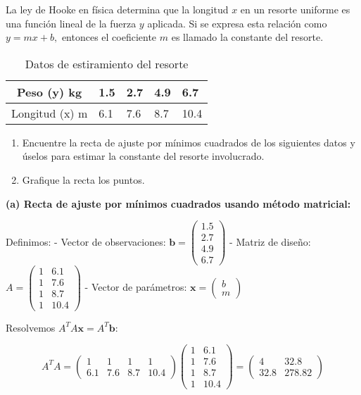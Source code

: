\begin{prob}
La ley de Hooke en física determina que la longitud $x$ en un resorte uniforme es una función lineal de la fuerza $y$ aplicada. Si se expresa esta relación como $y=mx+b,$ entonces el coeficiente $m$ es llamado la constante del resorte. 

\begin{table}[H]
\centering
\begin{tabular}{|c|l|l|l|l|}
\hline
Peso (y) kg  & 1.5   & 2.7   & 4.9  & 6.7    \\ \hline
Longitud (x) m & 6.1 & 7.6 & 8.7 & 10.4 \\ \hline
\end{tabular}
\caption{Datos de estiramiento del resorte}
\end{table}  

\begin{enumerate}[$(a)$]
\item Encuentre la recta de ajuste por mínimos cuadrados de los siguientes datos y úselos para estimar la constante del resorte involucrado.
\item Grafique la recta los puntos.
\end{enumerate}

\begin{myproof}
\textbf{(a) Recta de ajuste por mínimos cuadrados usando método matricial:}

Definimos:
- Vector de observaciones: \(\mathbf{b} = \begin{pmatrix} 1.5 \\ 2.7 \\ 4.9 \\ 6.7 \end{pmatrix}\)
- Matriz de diseño: \(A = \begin{pmatrix} 1 & 6.1 \\ 1 & 7.6 \\ 1 & 8.7 \\ 1 & 10.4 \end{pmatrix}\)
- Vector de parámetros: \(\mathbf{x} = \begin{pmatrix} b \\ m \end{pmatrix}\)

Resolvemos \(A^TA\mathbf{x} = A^T\mathbf{b}\):

\[
A^TA = \begin{pmatrix}
1 & 1 & 1 & 1 \\
6.1 & 7.6 & 8.7 & 10.4
\end{pmatrix}
\begin{pmatrix}
1 & 6.1 \\
1 & 7.6 \\
1 & 8.7 \\
1 & 10.4
\end{pmatrix} = \begin{pmatrix}
4 & 32.8 \\
32.8 & 278.82
\end{pmatrix}
\]


\end{myproof}
\end{prob}
